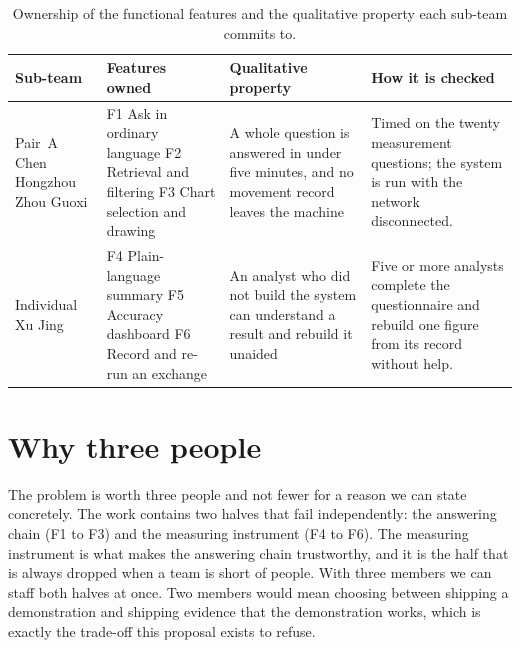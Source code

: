 \documentclass[12pt,a4paper]{report}
\begin{document}
\begin{table}[H]
  \centering
  \caption{Ownership of the functional features and the qualitative property
    each sub-team commits to.}
  \label{tab:ownership}
  \begin{tabular}{@{}p{2.6cm}p{4.2cm}p{4.5cm}p{3.3cm}@{}}
    \toprule[1.5pt]
    \textbf{Sub-team} & \textbf{Features owned} & \textbf{Qualitative property}
      & \textbf{How it is checked} \\
    \midrule
    Pair~A \newline Chen Hongzhou \newline Zhou Guoxi &
      F1 Ask in ordinary language \newline F2 Retrieval and filtering \newline
      F3 Chart selection and drawing &
      A whole question is answered in under five minutes, and no movement
      record leaves the machine &
      Timed on the twenty measurement questions; the system is run with the
      network disconnected. \\
    \addlinespace
    Individual \newline Xu Jing &
      F4 Plain-language summary \newline F5 Accuracy dashboard \newline
      F6 Record and re-run an exchange &
      An analyst who did not build the system can understand a result and
      rebuild it unaided &
      Five or more analysts complete the questionnaire and rebuild one figure
      from its record without help. \\
    \bottomrule[1.5pt]
  \end{tabular}
\end{table}

\section{Why three people}

The problem is worth three people and not fewer for a reason we can state
concretely. The work contains two halves that fail independently: the answering
chain (F1 to F3) and the measuring instrument (F4 to F6). The measuring
instrument is what makes the answering chain trustworthy, and it is the half
that is always dropped when a team is short of people. With three members we can
staff both halves at once. Two members would mean choosing between shipping a
demonstration and shipping evidence that the demonstration works, which is
exactly the trade-off this proposal exists to refuse.
\end{document}

